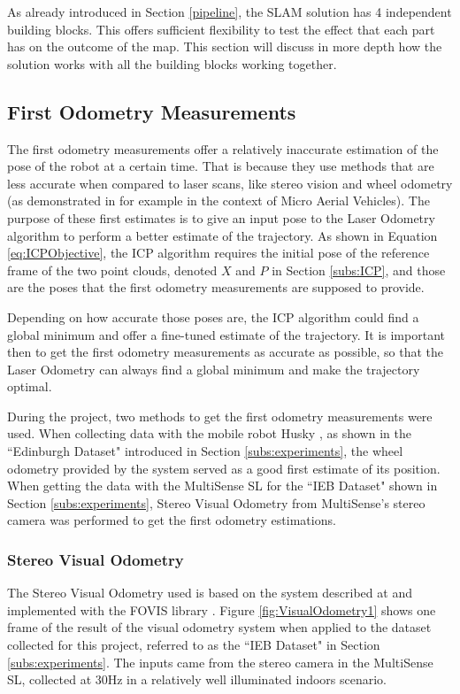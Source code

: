 \documentclass[11pt]{article}
\begin{document}
As already introduced in Section \ref{pipeline}, the SLAM solution has 4 independent building blocks. This offers sufficient flexibility to test the effect that each part has on the outcome of the map. This section will discuss in more depth how the solution works with all the building blocks working together. 
	 
	\subsection{First Odometry Measurements}

The first odometry measurements offer a relatively inaccurate estimation of the pose of the robot at a certain time. That is because they use methods that are less accurate when compared to laser scans, like stereo vision and wheel odometry (as demonstrated in \cite{achtelik2009stereo} for example in the context of Micro Aerial Vehicles). The purpose of these first estimates is to give an input pose to the Laser Odometry algorithm to perform a better estimate of the trajectory. As shown in Equation \ref{eq:ICPObjective}, the ICP algorithm requires the initial pose of the reference frame of the two point clouds, denoted $X$ and $P$ in Section \ref{subs:ICP}, and those are the poses that the first odometry measurements are supposed to provide.

Depending on how accurate those poses are, the ICP algorithm could find a global minimum and offer a fine-tuned estimate of the trajectory. It is important then to get the first odometry measurements as accurate as possible, so that the Laser Odometry can always find a global minimum and make the trajectory optimal.
	
During the project, two methods to get the first odometry measurements were used. When collecting data with the mobile robot Husky \cite{Husky}, as shown in the ``Edinburgh Dataset" introduced in Section \ref{subs:experiments}, the wheel odometry provided by the system served as a good first estimate of its position. When getting the data with the MultiSense SL \cite{multisense} for the ``IEB Dataset" shown in Section \ref{subs:experiments}, Stereo Visual Odometry from MultiSense's stereo camera was performed to get the first odometry estimations.
	
	\subsubsection*{Stereo Visual Odometry}

The Stereo Visual Odometry used is based on the system described at \cite{VisualOdometry} and implemented with the FOVIS library \cite{fovis}. Figure \ref{fig:VisualOdometry1} shows one frame of the result of the visual odometry system when applied to the dataset collected for this project, referred to as the ``IEB Dataset" in Section \ref{subs:experiments}. The inputs came from the stereo camera in the MultiSense SL, collected at 30Hz in a relatively well illuminated indoors scenario.
	
\end{document}
